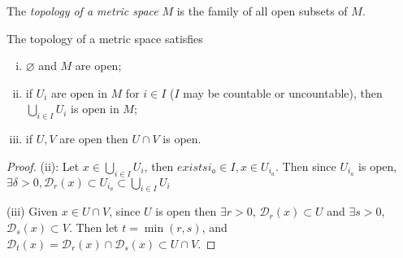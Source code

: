\begin{definition}
	The \textit{topology of a metric space} \( M \) is the family of all open subsets of \( M \).
\end{definition}
\begin{proposition}
	The topology of a metric space satisfies
	\begin{enumerate}[(i)]
		\item \( \varnothing \) and \( M \) are open;
		\item if \( U_i \) are open in \( M \) for \( i \in I \) (\( I \) may be countable or uncountable), then \( \bigcup_{i \in I} U_i \) is open in \( M \);
		\item if \( U, V \) are open then \( U \cap V \) is open.
	\end{enumerate}
\end{proposition}
\begin{proof}
	(ii): Let \( x \in \bigcup_{i \in I} U_i \), then \( exists i_a \in I, x \in U_{i_a} \).
	Then since \( U_{i_a} \) is open, \( \exists \delta > 0, \mathcal D_r(x) \subset U_{i_a} \subset \bigcup_{i \in I} U_i \)

	(iii) Given \( x \in U \cap V \), since \( U \) is open then \( \exists r > 0 \), \( \mathcal D_r(x) \subset U \) and \( \exists s > 0 \), \( \mathcal D_s(x) \subset V \).
	Then let \( t = \min(r,s) \), and \( \mathcal D_t(x) = \mathcal D_r(x) \cap \mathcal D_s(x) \subset U \cap V \).
\end{proof}
